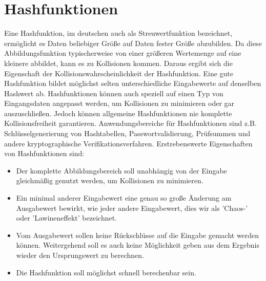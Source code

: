 \section{Hashfunktionen}
Eine Hashfunktion, im deutschen auch als Streuwertfunktion bezeichnet, ermöglicht es Daten beliebiger Größe auf Daten fester Größe abzubilden. Da diese Abbildungsfunktion typischerweise von einer größeren Wertemenge auf eine kleinere abbildet, kann es zu Kollisionen kommen. Daraus ergibt sich die Eigenschaft der Kollisionswahrscheinlichkeit der Hashfunktion. Eine gute Hashfunktion bildet möglichst selten unterschiedliche Eingabewerte auf denselben Hashwert ab. Hashfunktionen können auch speziell auf einen Typ von Eingangsdaten angepasst werden, um Kollisionen zu minimieren oder gar auszuschließen. Jedoch können allgemeine Hashfunktionen nie komplette Kollisionsfreiheit garantieren. Anwendungsbereiche für Hashfunktionen sind z.B. Schlüsselgenerierung von Hashtabellen, Passwortvalidierung, Prüfsummen und andere kryptographische Verifikationsverfahren.
Erstrebenswerte Eigenschaften von Hashfunktionen sind:
\begin{itemize}
\item Der komplette Abbildungsbereich soll unabhängig von der Eingabe gleichmäßig genutzt werden, um Kollisionen zu minimieren.
\item Ein minimal anderer Eingabewert eine genau so große Änderung am Ausgabewert bewirkt, wie jeder andere Eingabewert, dies wir als 'Chaos-' oder  'Lawineneffekt' bezeichnet.
\item Vom Ausgabewert sollen keine Rückschlüsse auf die Eingabe gemacht werden können. Weitergehend soll es auch keine Möglichkeit geben aus dem Ergebnis wieder den Ursprungswert zu berechnen.
\item Die Hashfunktion soll möglichst schnell berechenbar sein.
\end{itemize}
\cite[S.77ff.]{1841202}

